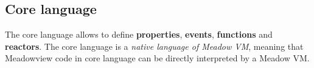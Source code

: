 \documentclass{note}
\begin{document}
{%





\subsection{Core language}
The core language allows to define 
\textcolor{blue2}{\bf properties}, 
\textcolor{blue2}{\bf events}, 
\textcolor{blue2}{\bf functions} and 
\textcolor{blue2}{\bf reactors}. 
The core language is a \textcolor{green2}{\em native language of Meadow VM\/},
meaning that Meadowview code in core language can be directly interpreted by a
Meadow VM. 


}
\end{document}
